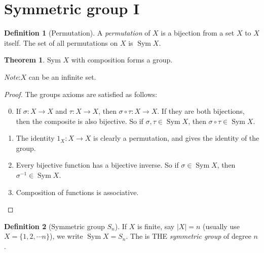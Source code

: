 \documentclass[a4paper]{article}
\theoremstyle{definition}
\newtheorem*{thm}{Theorem}
\newtheorem*{defi}{Definition}
\newcommand{\note}{\noindent \emph{Note}:\;}
\let\stdsection\section
\renewcommand\section{\newpage\stdsection}
\DeclareMathOperator\Sym{Sym}
\begin{document}
\section{Symmetric group I}
\begin{defi}[Permutation]
  A \emph{permutation} of $X$ is a bijection from a set $X$ to $X$ itself. The set of all permutations on $X$ is $\Sym X$.
\end{defi}

\begin{thm}
  Sym $X$ with composition forms a group.
\end{thm}
\note $X$ can be an infinite set.

\begin{proof}
  The groups axioms are satisfied as follows:
  \begin{enumerate}[label=\arabic{*}.]
  \setcounter{enumi}{-1}
  \item If $\sigma: X\to X$ and $\tau: X\to X$, then $\sigma\circ\tau:X\to X$. If they are both bijections, then the composite is also bijective. So if $\sigma, \tau\in \Sym X$, then $\sigma\circ\tau\in\Sym X$.
  \item The identity $1_X:X\to X$ is clearly a permutation, and gives the identity of the group.
  \item Every bijective function has a bijective inverse. So if $\sigma\in \Sym X$, then $\sigma^{-1} \in \Sym X$.
  \item Composition of functions is associative.
  \end{enumerate}
\end{proof}
\begin{defi}[Symmetric group $S_n$]
  If $X$ is finite, say $|X| = n$ (usually use $X = \{1, 2, \cdots n\}$), we write $\Sym X = S_n$. The is THE \emph{symmetric group} of degree $n$.
\end{defi}
\end{document}
